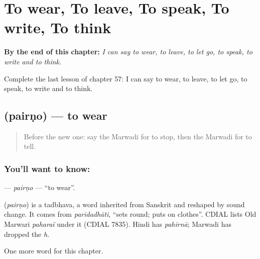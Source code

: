 
\chapter{To wear, To leave, To speak, To write, To think}
\label{ch:mw-to-wear-to-leave-to-speak-to-write-to-think}

\begin{chapteropening}
\textbf{By the end of this chapter:} \emph{I can say to wear, to leave, to let go, to speak, to write and to think.}

Complete the last lesson of chapter 57: I can say to wear, to leave, to let go, to speak, to write and to think.
\end{chapteropening}

\section[\texorpdfstring{\mw{पैरणो} (pairṇo)}{पैरणो (pairṇo)}]{ (pairṇo) — to wear}

\label{lesson:MW-C57-pairno}



\begin{quote}
Before the new one: say the Marwadi for to stop, then the Marwadi for to tell.
\end{quote}

\subsection*{You'll want to know: }
\textbf{} — \emph{pairṇo} — \textquotedblleft{}to wear\textquotedblright{}.

\begin{cousinweb}
\textbf{} (\emph{pairṇo}) is a tadbhava, a word inherited from Sanskrit and reshaped by sound change. It comes from \emph{paridadhāti}, \textquotedblleft{}sets round; puts on clothes\textquotedblright{}. CDIAL lists Old Marwari \emph{paharaï} under it (CDIAL 7835). Hindi has \emph{pahirnā}; Marwadi has dropped the \emph{h}.
\end{cousinweb}

\begin{grammarlens}[title={What you've built}]
One more word for this chapter.
\end{grammarlens}

